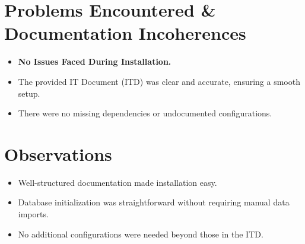 \section{Problems Encountered \& Documentation Incoherences}
\begin{itemize}
    \item \textbf{No Issues Faced During Installation.}
    \item The provided IT Document (ITD) was clear and accurate, ensuring a smooth setup.
    \item There were no missing dependencies or undocumented configurations.
\end{itemize}

\section{Observations}

\begin{itemize}
    \item Well-structured documentation made installation easy.
    \item Database initialization was straightforward without requiring manual data imports.
    \item No additional configurations were needed beyond those in the ITD.
\end{itemize}
